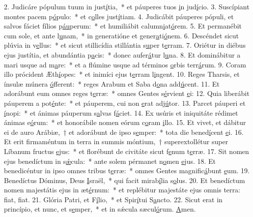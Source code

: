 2. Judicáre pópulum tuum in just\uline{í}tia,~* et páuperes tuos \uline{i}n jud\uline{í}cio.
3. Suscípiant montes pacem p\uline{ó}pulo:~* et c\uline{o}lles just\uline{í}tiam.
4. Judicábit páuperes pópuli, et salvos fáciet fílios p\uline{áu}perum:~* et humiliábit calumn\uline{i}at\uline{ó}rem.
5. Et permanébit cum sole, et ante l\uline{u}nam,~* in generatióne et gener\uline{a}ti\uline{ó}nem.
6. Descéndet sicut plúvia in v\uline{e}llus:~* et sicut stillicídia stillántia s\uline{u}per t\uline{e}rram.
7. Oriétur in diébus ejus justítia, et abundántia p\uline{a}cis:~* donec aufer\uline{á}tur l\uline{u}na.
8. Et dominábitur a mari usque ad m\uline{a}re:~* et a flúmine usque ad términos \uline{o}rbis terr\uline{á}rum.
9. Coram illo prócident Æth\uline{í}opes:~* et inimíci ejus t\uline{e}rram l\uline{i}ngent.
10. Reges Tharsis, et ínsulæ múnera \uline{ó}fferent:~* reges Arabum et Saba d\uline{o}na add\uline{ú}cent.
11. Et adorábunt eum omnes reges t\uline{e}rræ:~* omnes Gentes s\uline{é}rvient \uline{e}i:
12. Quia liberábit páuperem a pot\uline{é}nte:~* et páuperem, cui non \uline{e}rat adj\uline{ú}tor.
13. Parcet páuperi et \uline{í}nopi:~* et ánimas páuperum s\uline{a}lvas f\uline{á}ciet.
14. Ex usúris et iniquitáte rédimet ánimas e\uline{ó}rum:~* et honorábile nomen eórum c\uline{o}ram \uline{i}llo.
15. Et vivet, et dábitur ei de auro Arábiæ,~† et adorábunt de ipso s\uline{e}mper:~* tota die bened\uline{í}cent \uline{e}i.
16. Et erit firmaméntum in terra in summis móntium,~† superextollétur super Líbanum fructus \uline{e}jus:~* et florébunt de civitáte sicut f\uline{e}num t\uline{e}rræ.
17. Sit nomen ejus benedíctum in s\uline{ǽ}cula:~* ante solem pérmanet n\uline{o}men \uline{e}jus.
18. Et benedicéntur in ipso omnes tribus t\uline{e}rræ:~* omnes Gentes magnific\uline{á}bunt \uline{e}um.
19. Benedíctus Dóminus, Deus \uline{I}sraël,~* qui facit mirab\uline{í}lia s\uline{o}lus.
20. Et benedíctum nomen majestátis ejus in æt\uline{é}rnum:~* et replébitur majestáte ejus omnis terra: f\uline{i}at, f\uline{i}at.
21. Glória Patri, et F\uline{í}lio,~* et Spir\uline{í}tui S\uline{a}ncto.
22. Sicut erat in princípio, et nunc, et s\uline{e}mper,~* et in sǽcula sæcul\uline{ó}rum. \uline{A}men.

